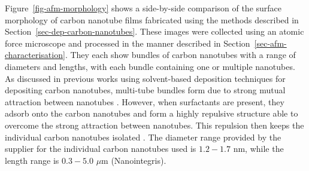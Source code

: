 \documentclass[
  a4paper,
]{scrbook}
\begin{document}
Figure~\ref{fig-afm-morphology} shows a side-by-side comparison of the
surface morphology of carbon nanotube films fabricated using the methods
described in Section~\ref{sec-dep-carbon-nanotubes}. These images were
collected using an atomic force microscope and processed in the manner
described in Section~\ref{sec-afm-characterisation}. They each show
bundles of carbon nanotubes with a range of diameters and lengths, with
each bundle containing one or multiple nanotubes. As discussed in
previous works using solvent-based deposition techniques for depositing
carbon nanotubes, multi-tube bundles form due to strong mutual
attraction between nanotubes
\autocite{Zheng2017,Thanihaichelvan2018,Thanihaichelvan2019,Nguyen2021}.
However, when surfactants are present, they adsorb onto the carbon
nanotubes and form a highly repulsive structure able to overcome the
strong attraction between nanotubes. This repulsion then keeps the
individual carbon nanotubes isolated
\autocite{Wenseleers2004,Shimizu2013}. The diameter range provided by
the supplier for the individual carbon nanotubes used is \(1.2-1.7\) nm,
while the length range is \(0.3-5.0\) \(\mu\)m (Nanointegris).
\end{document}
